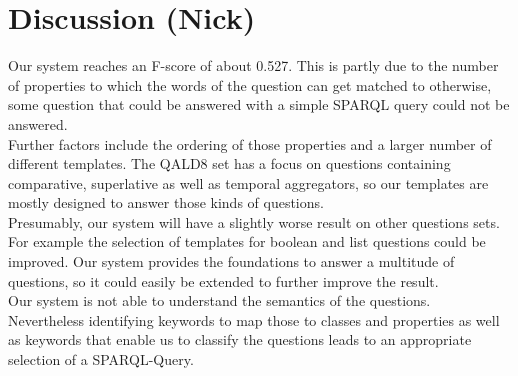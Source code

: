 \documentclass[runningheads]{llncs}
\begin{document}
\pagebreak
\section{Discussion (Nick)} 
Our system reaches an F-score of about 0.527. This is partly due to the number of properties to which the words of the question can get matched to otherwise, some question that could be answered with a simple SPARQL query could not be answered. \\

Further factors include the ordering of those properties and a larger number of different templates. 
The QALD8 set has a focus on questions containing comparative, superlative as well as temporal aggregators, so our templates are mostly designed to answer those kinds of questions. \\

Presumably, our system will have a slightly worse result on other questions sets. For example the selection of templates for boolean and list questions could be improved.  Our system provides the foundations to answer a multitude of questions, so it could easily be extended to further improve the result.\\

Our system is not able to understand the semantics of the questions. \\
Nevertheless identifying keywords to map those to classes and properties as well as keywords that enable us to classify the questions leads to an appropriate selection of a SPARQL-Query.



%
%
%
% 
% 
%


\end{document}
